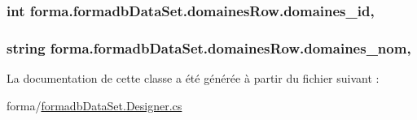\subsubsection[{\texorpdfstring{domaines\+\_\+id}{domaines_id}}]{\setlength{\rightskip}{0pt plus 5cm}int forma.\+formadb\+Data\+Set.\+domaines\+Row.\+domaines\+\_\+id\hspace{0.3cm}{\ttfamily [get]}, {\ttfamily [set]}}\hypertarget{classforma_1_1formadb_data_set_1_1domaines_row_adf854bbaabea4c6e85c637435f46512d}{}\label{classforma_1_1formadb_data_set_1_1domaines_row_adf854bbaabea4c6e85c637435f46512d}
\subsubsection[{\texorpdfstring{domaines\+\_\+nom}{domaines_nom}}]{\setlength{\rightskip}{0pt plus 5cm}string forma.\+formadb\+Data\+Set.\+domaines\+Row.\+domaines\+\_\+nom\hspace{0.3cm}{\ttfamily [get]}, {\ttfamily [set]}}\hypertarget{classforma_1_1formadb_data_set_1_1domaines_row_a87dd29f848c8e28d70736628b0ab9a04}{}\label{classforma_1_1formadb_data_set_1_1domaines_row_a87dd29f848c8e28d70736628b0ab9a04}


La documentation de cette classe a été générée à partir du fichier suivant \+:\begin{DoxyCompactItemize}
\item 
forma/\hyperlink{formadb_data_set_8_designer_8cs}{formadb\+Data\+Set.\+Designer.\+cs}\end{DoxyCompactItemize}
